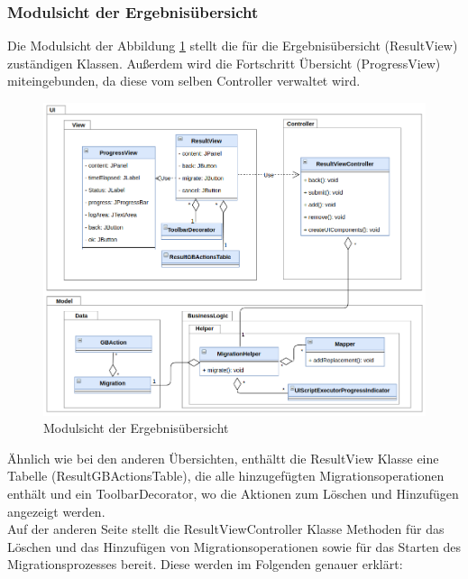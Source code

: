 	
	
	\subsubsection{Modulsicht der Ergebnisübersicht}
	Die Modulsicht der Abbildung \ref{img:modulsicht-resul} stellt die für die Ergebnisübersicht (ResultView) zuständigen Klassen. Außerdem wird die Fortschritt Übersicht (ProgressView) miteingebunden, da diese vom selben Controller verwaltet wird.
	\begin{figure}[H]
		\centering
		\includegraphics[width=\textwidth]{images/sichten/modulsicht-result}
		\caption{Modulsicht der Ergebnisübersicht}
		\label{img:modulsicht-resul}
	\end{figure}
	Ähnlich wie bei den anderen Übersichten, enthältt die ResultView Klasse eine Tabelle (ResultGBActionsTable), die alle hinzugefügten Migrationsoperationen enthält und ein ToolbarDecorator, wo die Aktionen zum Löschen und Hinzufügen angezeigt werden. \\
	Auf der anderen Seite stellt die ResultViewController Klasse Methoden für das Löschen und das Hinzufügen von Migrationsoperationen sowie für das Starten des Migrationsprozesses bereit. Diese werden im Folgenden genauer erklärt:
